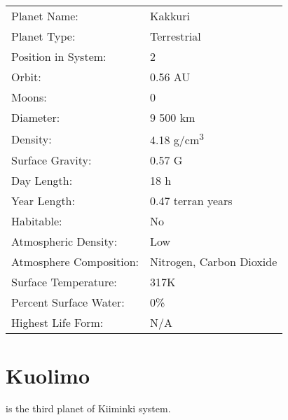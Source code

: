 \documentclass{tufte-book}
\begin{document}
\bigskip
\begin{minipage}{\textwidth}
\begin{center}
\begin{tabular}{ll}
\toprule
Planet Name: & Kakkuri \\
Planet Type: & Terrestrial \\
Position in System: & 2 \\
Orbit: & 0.56 AU \\
Moons: & 0 \\
Diameter: & 9 500 km \\
Density: & 4.18 g/cm\textsuperscript{3} \\
Surface Gravity: & 0.57 G \\
Day Length: & 18 h \\
Year Length: & 0.47 terran years \\
Habitable: & No \\
\quad Atmospheric Density: & Low \\
\quad Atmosphere Composition: & Nitrogen, Carbon Dioxide \\
\quad Surface Temperature: & 317K \\
\quad Percent Surface Water: & 0\% \\
\quad Highest Life Form: & N/A \\

\bottomrule
\end{tabular}
\end{center}
\end{minipage}

\section{Kuolimo}

 is the third planet of Kiiminki system.
\end{document}
